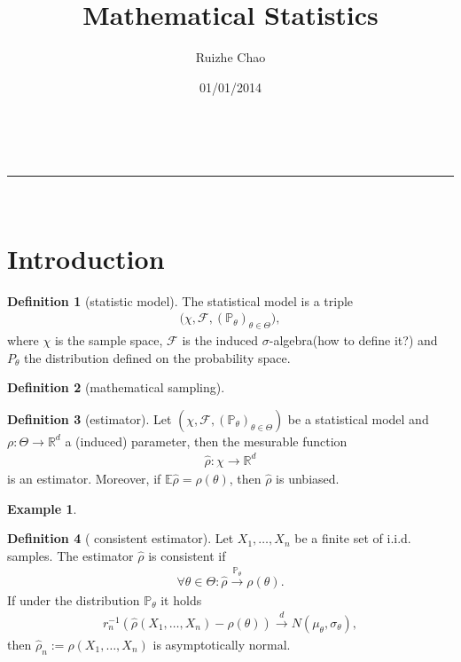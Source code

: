 \documentclass[a4paper,12pt, oneside, fleqn]{book}
\makeatletter
\theoremstyle{definition}
\newtheorem{definition}{Definition}[section]
\newtheorem*{example}{Example}
\theoremstyle{remark}
\newcommand{\linia}{\rule{\linewidth}{0.5pt}}
\renewcommand{\maketitle}{
\begin{center}
\vspace{2ex}
{\huge \textsc{\@title}}
\vspace{1ex}
\\
\linia\\
\@author \hfill \@date
\vspace{4ex}
\end{center}
}
\makeatother
\begin{document}
\title{Mathematical Statistics}
\author{Ruizhe Chao}
\date{01/01/2014}
\maketitle

\section{Introduction}
\begin{definition}[statistic model]
	The statistical model is a triple
	\begin{align*}
		\bigg(\chi, \mathcal{F}, (\mathbb{P}_\theta)_{\theta \in \Theta} \bigg),
	\end{align*}
	where $\chi$ is the sample space, $\mathcal{F}$ is the induced $\sigma$-algebra(how to define it?) and $P_\theta$ the distribution defined on the probability space. 
\end{definition}

\begin{definition}[mathematical sampling] 
\end{definition}

\begin{definition}[estimator]
	Let $(\chi, \mathcal{F}, (\mathbb{P}_\theta)_{\theta \in \Theta})$ be a statistical model and $\rho: \Theta \rightarrow \mathbb{R}^d$ a (induced) parameter, then the mesurable function
	\begin{align*}
		\hat{\rho}: \chi \rightarrow \mathbb{R}^d
	\end{align*}
	is an estimator. Moreover, if $\mathbb{E} \hat{\rho} = \rho(\theta)$, then $\hat{\rho}$ is unbiased. 
\end{definition}

\begin{example}
	
\end{example}


\begin{definition}[ consistent estimator]
	Let $X_1, \dots, X_n$ be a finite set of i.i.d. samples. The estimator $\hat{\rho}$ is consistent if 
	\begin{align*}
		\forall \theta \in \Theta: \hat{\rho} \overset{\mathbb{P}_\theta}{\longrightarrow} \rho(\theta).
	\end{align*}
	If under the distribution $\mathbb{P}_\theta$ it holds
	\begin{align*}
		r_n^{-1} (\hat{\rho}(X_1, \dots, X_n) - \rho(\theta)) \overset{d}{\longrightarrow} N(\mu_\theta, \sigma_\theta), 
	\end{align*}
	then $\hat{\rho}_n:= \hat{\rho}(X_1, \dots, X_n)$ is asymptotically normal. 
\end{definition}
\end{document}
